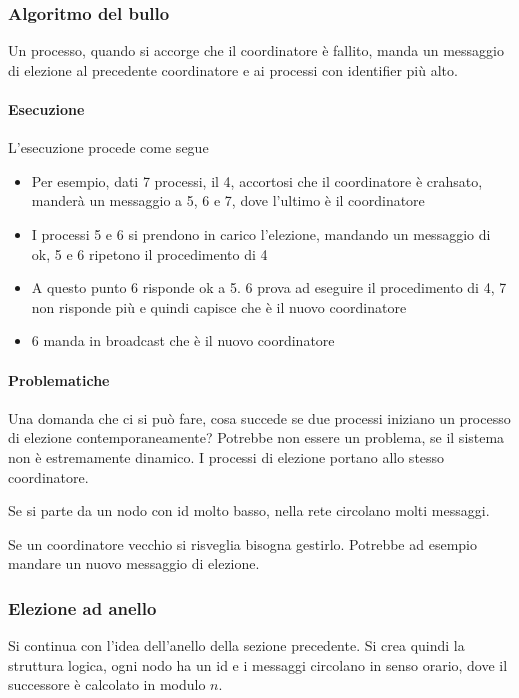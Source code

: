 \subsubsection{Algoritmo del bullo}
Un processo, quando si accorge che il coordinatore 
è fallito, manda un messaggio di elezione 
al precedente coordinatore e ai processi con identifier più alto.

\paragraph{Esecuzione}
L'esecuzione procede come segue 
\begin{itemize}
    \item Per esempio, dati 7 processi, il 4, accortosi che il coordinatore 
    è crahsato, manderà un messaggio a 5, 6 e 7, dove l'ultimo è il coordinatore
    \item I processi 5 e 6 si prendono in carico l'elezione, 
    mandando un messaggio di ok, 5 e 6 ripetono il procedimento 
    di 4
    \item A questo punto 6 risponde ok a 5.
    6 prova ad eseguire il procedimento di 4, 7 non risponde più
    e quindi capisce che è il nuovo coordinatore
    \item 6 manda in broadcast che è il nuovo coordinatore
\end{itemize}

\paragraph{Problematiche}
Una domanda che ci si può fare, cosa succede se due processi 
iniziano un processo di elezione contemporaneamente?
Potrebbe non essere un problema, se il sistema non è estremamente 
dinamico. I processi di elezione portano allo stesso coordinatore.

Se si parte da un nodo con id molto basso, nella rete circolano 
molti messaggi.

Se un coordinatore vecchio si risveglia bisogna gestirlo. Potrebbe ad 
esempio mandare un nuovo messaggio di elezione.

\subsubsection{Elezione ad anello}

Si continua con l'idea dell'anello della sezione precedente.
Si crea quindi la struttura logica, ogni nodo ha un id e i messaggi 
circolano in senso orario, dove il successore è calcolato in modulo 
$n$.

